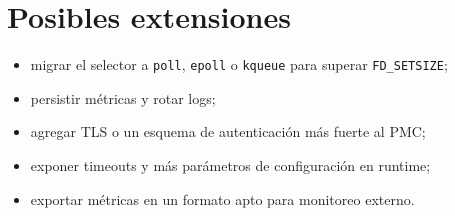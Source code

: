 \section{Posibles extensiones}

\begin{itemize}[nosep]
  \item migrar el selector a \texttt{poll}, \texttt{epoll} o \texttt{kqueue} para
  superar \texttt{FD\_SETSIZE};
  \item persistir métricas y rotar logs;
  \item agregar TLS o un esquema de autenticación más fuerte al PMC;
  \item exponer timeouts y más parámetros de configuración en runtime;
  \item exportar métricas en un formato apto para monitoreo externo.
\end{itemize}
